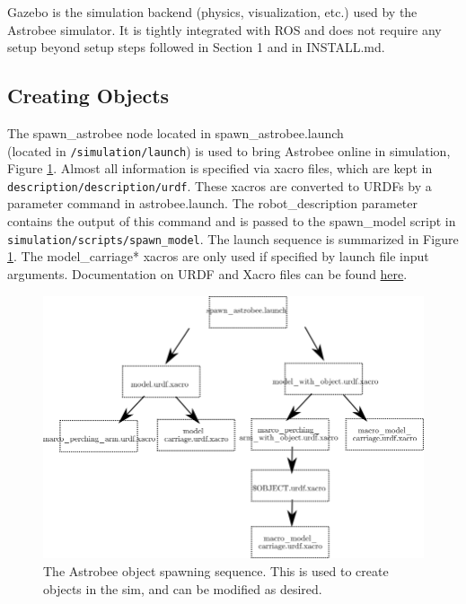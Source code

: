 \documentclass{article}
\begin{document}
Gazebo is the simulation backend (physics, visualization, etc.) used by the Astrobee simulator. It is tightly integrated with ROS and does not require any setup beyond setup steps followed in Section 1 and in INSTALL.md.

\subsection{Creating Objects}

The spawn\_astrobee node located in spawn\_astrobee.launch \\
(located in \texttt{/simulation/launch}) is used to bring Astrobee online in simulation, Figure \ref{fig:spawn}. Almost all information is specified via xacro files, which are kept in \texttt{description/description/urdf}. These xacros are converted to URDFs by a parameter command in astrobee.launch. The robot\_description parameter contains the output of this command and is passed to the spawn\_model script in \texttt{simulation/scripts/spawn\_model}. The launch sequence is summarized in Figure \ref{fig:spawn}. The model\_carriage* xacros are only used if specified by launch file input arguments. Documentation on URDF and Xacro files can be found \href{http://wiki.ros.org/urdf/XML}{here}.

\begin{figure}[h!]
    \begin{adjustwidth}{-0.5in}{-1in}
    \centering
    \includegraphics[width=1.3\textwidth]{img/astrobee4.png}
    \caption{The Astrobee object spawning sequence. This is used to create objects in the sim, and can be modified as desired.}
    \label{fig:spawn}
    \end{adjustwidth}
\end{figure}
\end{document}
